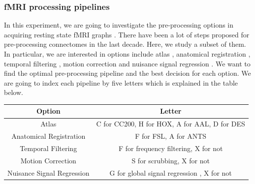 \documentclass{article}
\begin{document}
\subsubsection{fMRI processing pipelines}
In this experiment, we are going to investigate the pre-processing options in acquiring resting state fMRI graphs \cite{huettel2004functional}. There have been a lot of steps proposed for pre-processing connectomes in the last decade. Here, we study a subset of them. In particular, we are interested in options include atlas \cite{mai2015atlas}, anatomical registration \cite{klein2009evaluation}, temporal filtering \cite{smith1999investigation}, motion correction \cite{power2012spurious} and nuisance signal regression \cite{fox2009global}. We want to find the optimal pre-processing pipeline and the best decision for each option. We are going to index each pipeline by five letters which is explained in the table below.   
\begin{center}
	\begin{tabular}{ |c|c| } 
		\hline
		Option & Letter  \\ \hline
		Atlas & C for CC200, H for HOX, A for AAL, D for DES \cite{craddock2012whole,desikan2006automated} \\ \hline
		Anatomical Registration & F for FSL, A for ANTS \cite{andersson2007non,avants2009advanced}\\ \hline
		Temporal Filtering & F for frequency filtering, X for not  \cite{smith1999investigation}\\ \hline
		Motion Correction & S for scrubbing, X for not  \cite{power2012spurious} \\ \hline
		Nuisance Signal Regression & G for global signal regression , X for not \cite{fox2009global} \\ \hline
	\end{tabular}
\end{center}
\end{document}
